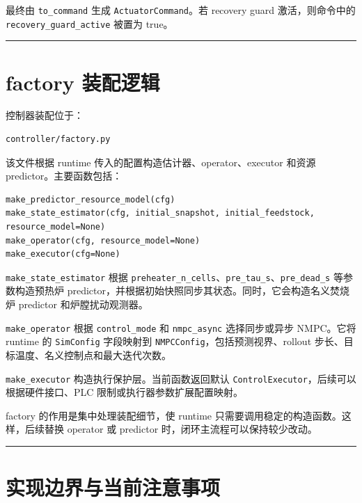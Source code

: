 \documentclass[UTF8,openany,zihao=-4,oneside]{ctexbook}
\providecommand{\passthrough}[1]{#1}
\newcommand{\manualdivider}{\par\vspace{0.6em}\noindent\textcolor{FGLine}{\rule{\linewidth}{0.7pt}}\vspace{0.6em}\par}
\begin{document}
最终由 \passthrough{\lstinline!to_command!} 生成 \passthrough{\lstinline!ActuatorCommand!}。若 recovery guard 激活，则命令中的 \passthrough{\lstinline!recovery_guard_active!} 被置为 true。

\manualdivider

\section{factory 装配逻辑}\label{sec:factory-implementation}

控制器装配位于：

\begin{lstlisting}
controller/factory.py
\end{lstlisting}

该文件根据 runtime 传入的配置构造估计器、operator、executor 和资源 predictor。主要函数包括：

\begin{lstlisting}
make_predictor_resource_model(cfg)
make_state_estimator(cfg, initial_snapshot, initial_feedstock, resource_model=None)
make_operator(cfg, resource_model=None)
make_executor(cfg=None)
\end{lstlisting}

\passthrough{\lstinline!make_state_estimator!} 根据 \passthrough{\lstinline!preheater_n_cells!}、\passthrough{\lstinline!pre_tau_s!}、\passthrough{\lstinline!pre_dead_s!} 等参数构造预热炉 predictor，并根据初始快照同步其状态。同时，它会构造名义焚烧炉 predictor 和炉膛扰动观测器。

\passthrough{\lstinline!make_operator!} 根据 \passthrough{\lstinline!control_mode!} 和 \passthrough{\lstinline!nmpc_async!} 选择同步或异步 NMPC。它将 runtime 的 \passthrough{\lstinline!SimConfig!} 字段映射到 \passthrough{\lstinline!NMPCConfig!}，包括预测视界、rollout 步长、目标温度、名义控制点和最大迭代次数。

\passthrough{\lstinline!make_executor!} 构造执行保护层。当前函数返回默认 \passthrough{\lstinline!ControlExecutor!}，后续可以根据硬件接口、PLC 限制或执行器参数扩展配置映射。

factory 的作用是集中处理装配细节，使 runtime 只需要调用稳定的构造函数。这样，后续替换 operator 或 predictor 时，闭环主流程可以保持较少改动。

\manualdivider

\section{实现边界与当前注意事项}\label{sec:implementation-boundary-notes}
\end{document}
